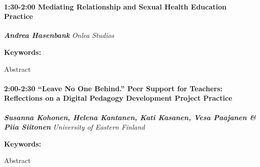 \documentclass[
]{book}
\begin{document}
\begin{session}
\hypertarget{mediating-relationship-and-sexual-health-education-practice}{%
\paragraph*{\texorpdfstring{1:30-2:00 \textbar{} \textbf{Mediating
Relationship and Sexual Health Education} \textbar{}
Practice}{1:30-2:00 \textbar{} Mediating Relationship and Sexual Health Education \textbar{} Practice}}\label{mediating-relationship-and-sexual-health-education-practice}}

\textbf{\emph{Andrea Hasenbank}} \textbar{} \emph{Onlea Studios}

\textbf{Keywords:}

Abstract
\end{session}
\begin{session}
\hypertarget{leave-no-one-behind.-peer-support-for-teachers-reflections-on-a-digital-pedagogy-development-project-practice}{%
\paragraph*{\texorpdfstring{2:00-2:30 \textbar{} \textbf{``Leave No One
Behind.'' Peer Support for Teachers: Reflections on a Digital Pedagogy
Development Project} \textbar{}
Practice}{2:00-2:30 \textbar{} ``Leave No One Behind.'' Peer Support for Teachers: Reflections on a Digital Pedagogy Development Project \textbar{} Practice}}\label{leave-no-one-behind.-peer-support-for-teachers-reflections-on-a-digital-pedagogy-development-project-practice}}

\textbf{\emph{Susanna Kohonen, Helena Kantanen, Kati Kasanen, Vesa
Paajanen \& Piia Siitonen}} \textbar{} \emph{University of Eastern
Finland}

\textbf{Keywords:}

Abstract
\end{session}
\end{document}
